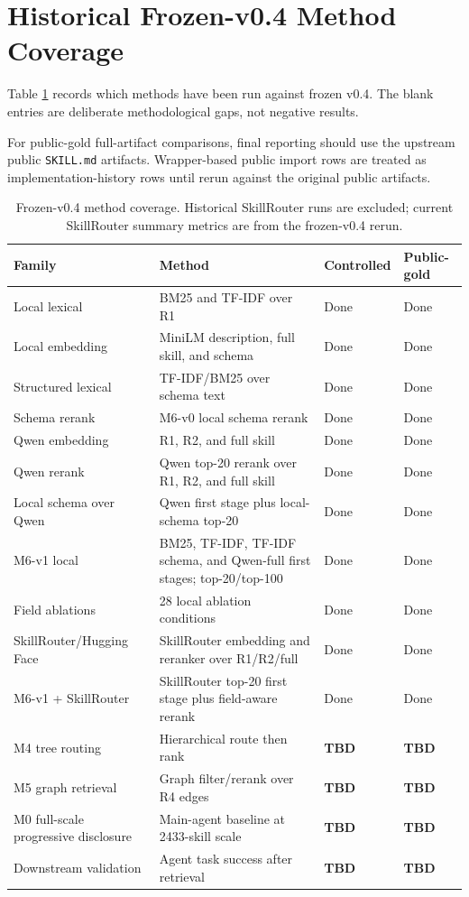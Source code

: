\section{Historical Frozen-v0.4 Method Coverage}

Table \ref{tab:method-coverage-v04} records which methods have been run against frozen v0.4. The blank entries are deliberate methodological gaps, not negative results.

For public-gold full-artifact comparisons, final reporting should use the upstream public \texttt{SKILL.md} artifacts. Wrapper-based public import rows are treated as implementation-history rows until rerun against the original public artifacts.

\begin{table}[h]
\centering
\scriptsize
\begin{tabular}{p{}p{}p{}p{}}
\toprule
Family & Method & Controlled & Public-gold \\
\midrule
Local lexical & BM25 and TF-IDF over R1 & Done & Done \\
Local embedding & MiniLM description, full skill, and schema & Done & Done \\
Structured lexical & TF-IDF/BM25 over schema text & Done & Done \\
Schema rerank & M6-v0 local schema rerank & Done & Done \\
Qwen embedding & R1, R2, and full skill & Done & Done \\
Qwen rerank & Qwen top-20 rerank over R1, R2, and full skill & Done & Done \\
Local schema over Qwen & Qwen first stage plus local-schema top-20 & Done & Done \\
M6-v1 local & BM25, TF-IDF, TF-IDF schema, and Qwen-full first stages; top-20/top-100 & Done & Done \\
Field ablations & 28 local ablation conditions & Done & Done \\
SkillRouter/Hugging Face & SkillRouter embedding and reranker over R1/R2/full & Done & Done \\
M6-v1 + SkillRouter & SkillRouter top-20 first stage plus field-aware rerank & Done & Done \\
M4 tree routing & Hierarchical route then rank & \textbf{TBD} & \textbf{TBD} \\
M5 graph retrieval & Graph filter/rerank over R4 edges & \textbf{TBD} & \textbf{TBD} \\
M0 full-scale progressive disclosure & Main-agent baseline at 2433-skill scale & \textbf{TBD} & \textbf{TBD} \\
Downstream validation & Agent task success after retrieval & \textbf{TBD} & \textbf{TBD} \\
\bottomrule
\end{tabular}
\caption{Frozen-v0.4 method coverage. Historical SkillRouter runs are excluded; current SkillRouter summary metrics are from the frozen-v0.4 rerun.}
\label{tab:method-coverage-v04}
\end{table}

